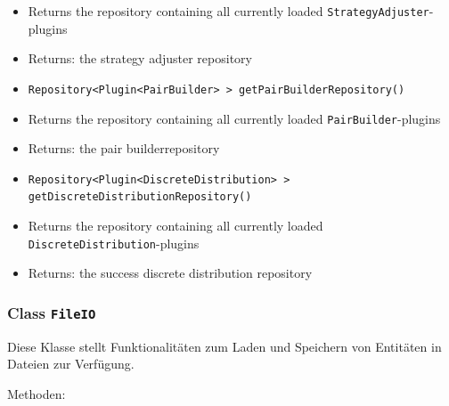 \documentclass[parskip=full,11pt]{scrartcl}
\begin{document}
\begin{itemize}
	\item[]Returns the repository containing all currently loaded \texttt{StrategyAdjuster}-plugins
	\item[] Returns: the strategy adjuster repository
	\item\texttt{Repository<Plugin<PairBuilder>\,> getPairBuilderRepository()}
	\item[]Returns the repository containing all currently loaded \texttt{PairBuilder}-plugins
	\item[] Returns: the pair builderrepository
	\item\texttt{Repository<Plugin<DiscreteDistribution>\,> getDiscreteDistributionRepository()}
	\item[]Returns the repository containing all currently loaded \texttt{DiscreteDistribution}-plugins
	\item[] Returns: the success discrete distribution repository
\end{itemize}

\subsubsection{Class \texttt{FileIO}}

Diese Klasse stellt Funktionalitäten zum Laden und Speichern von Entitäten in Dateien zur Verfügung.

Methoden:
\end{document}
